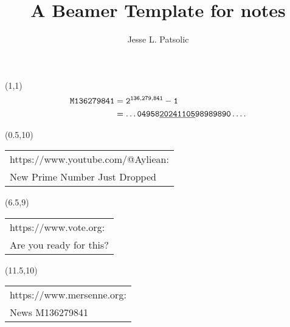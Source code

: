 \documentclass[xcolor=dvipsnames, aspectratio=169]{beamer}
\title[Daily Notes]{A Beamer Template for notes}
\subtitle[]{}
\author[JLP]{Jesse L. Patsolic}
\begin{document}
\begin{frame}[plain]
\begin{textblock}{3}(1,1)
    \hfill
    \huge{
    {\color{DarkRed}
	\begin{align*}
	\mathtt{M136279841} &= \mathtt{2^{136,279,841} - 1}\\
	    &=\mathtt{\dots04958\uline{20241105}98989890\dots.}
	\end{align*}
    }
}
    \hfill
\end{textblock}

\begin{textblock}{3.25}(0.5,10)
    \hspace{1mm}
    {\color{black!70}
	}\\%
	{\color{black!70}
	{\small
	\begin{tabular}{l}
	https://www.youtube.com/@Ayliean:\\ 
	New Prime Number Just Dropped
	\end{tabular}
	}
	}
\end{textblock}
\begin{textblock}{3.25}(6.5,9)
    \hspace{1mm}
    {\color{black!70}
	}\\%
	{\color{black!70}
	{\small
	\begin{tabular}{l}
	https://www.vote.org:\\ 
	Are you ready for this?
	\end{tabular}
	}
	}
\end{textblock}
\begin{textblock}{3.25}(11.5,10)
    \hspace{1mm}
	{\color{black!70}
	}\\%
	{\color{black!70}
	{\small
	\begin{tabular}{l}
	https://www.mersenne.org:\\ 
	News M136279841
	\end{tabular}
	}
	}
\end{textblock}
\end{frame}
\end{document}
